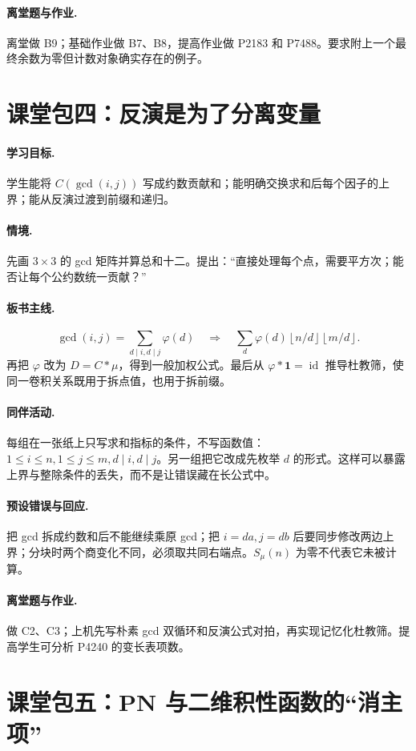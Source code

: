 \documentclass[UTF8,a4paper,11pt,twoside,openright,fontset=fandol]{ctexbook}
\theoremstyle{definition}
\newcommand{\one}{\mathbf 1}
\newcommand{\id}{\operatorname{id}}
\newcommand{\floor}[1]{\left\lfloor #1\right\rfloor}
\begin{document}
\paragraph{离堂题与作业.} 离堂做 B9；基础作业做 B7、B8，提高作业做 P2183 和 P7488。要求附上一个最终余数为零但计数对象确实存在的例子。

\section{课堂包四：反演是为了分离变量}
\paragraph{学习目标.} 学生能将 $C(\gcd(i,j))$ 写成约数贡献和；能明确交换求和后每个因子的上界；能从反演过渡到前缀和递归。
\paragraph{情境.} 先画 $3\times3$ 的 gcd 矩阵并算总和十二。提出：“直接处理每个点，需要平方次；能否让每个公约数统一贡献？”
\paragraph{板书主线.}
\[
\gcd(i,j)=\sum_{d\mid i,d\mid j}\varphi(d)
\quad\Longrightarrow\quad
\sum_d\varphi(d)\floor{n/d}\floor{m/d}.
\]
再把 $\varphi$ 改为 $D=C*\mu$，得到一般加权公式。最后从 $\varphi*\one=\id$ 推导杜教筛，使同一卷积关系既用于拆点值，也用于拆前缀。
\paragraph{同伴活动.} 每组在一张纸上只写求和指标的条件，不写函数值：$1\le i\le n,1\le j\le m,d\mid i,d\mid j$。另一组把它改成先枚举 $d$ 的形式。这样可以暴露上界与整除条件的丢失，而不是让错误藏在长公式中。
\paragraph{预设错误与回应.} 把 gcd 拆成约数和后不能继续乘原 gcd；把 $i=da,j=db$ 后要同步修改两边上界；分块时两个商变化不同，必须取共同右端点。$S_\mu(n)$ 为零不代表它未被计算。
\paragraph{离堂题与作业.} 做 C2、C3；上机先写朴素 gcd 双循环和反演公式对拍，再实现记忆化杜教筛。提高学生可分析 P4240 的变长表项数。

\section{课堂包五：PN 与二维积性函数的“消主项”}
\end{document}
